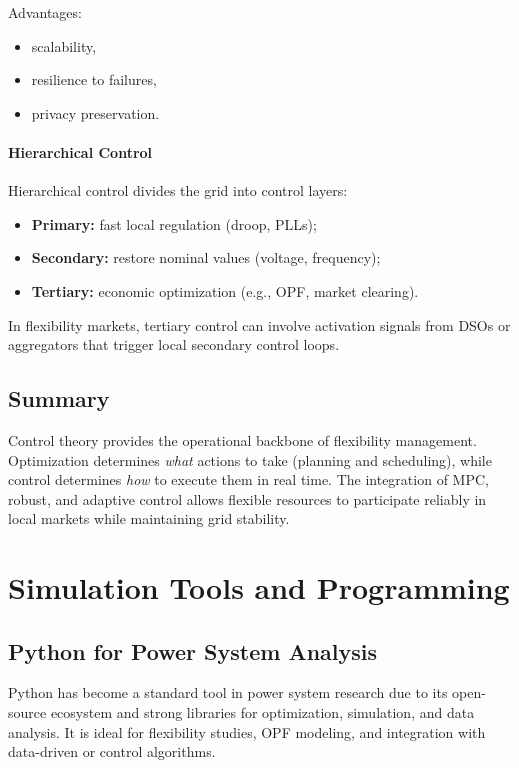 \documentclass[11pt]{article}
\begin{document}
	Advantages:
	\begin{itemize}
		\item scalability,
		\item resilience to failures,
		\item privacy preservation.
	\end{itemize}
	
	\paragraph{Hierarchical Control}
	
	Hierarchical control divides the grid into control layers:
	\begin{itemize}
		\item \textbf{Primary:} fast local regulation (droop, PLLs);
		\item \textbf{Secondary:} restore nominal values (voltage, frequency);
		\item \textbf{Tertiary:} economic optimization (e.g., OPF, market clearing).
	\end{itemize}
	
	In flexibility markets, tertiary control can involve activation signals from DSOs or aggregators that trigger local secondary control loops.
	
	\subsection*{Summary}
	
	Control theory provides the operational backbone of flexibility management.  
	Optimization determines \emph{what} actions to take (planning and scheduling), while control determines \emph{how} to execute them in real time.  
	The integration of MPC, robust, and adaptive control allows flexible resources to participate reliably in local markets while maintaining grid stability.
	
	
	\section{Simulation Tools and Programming}
	
	\subsection{Python for Power System Analysis}
	
	Python has become a standard tool in power system research due to its open-source ecosystem and strong libraries for optimization, simulation, and data analysis.  
	It is ideal for flexibility studies, OPF modeling, and integration with data-driven or control algorithms.
	
\end{document}
